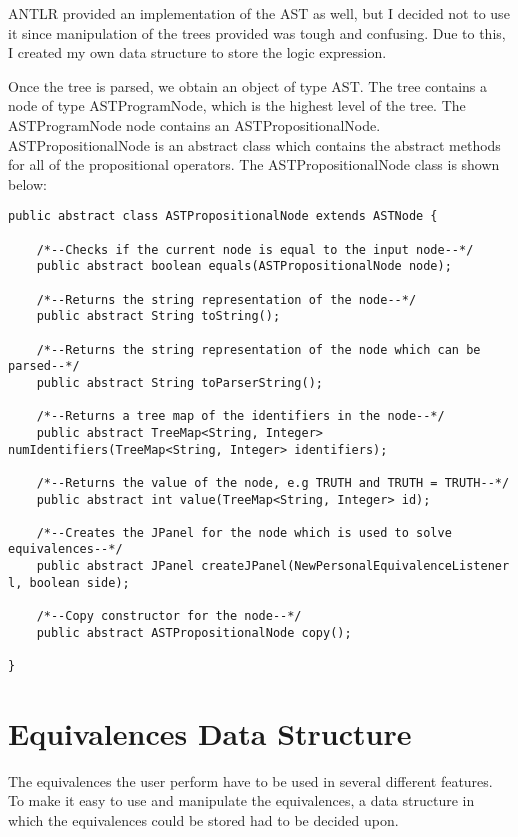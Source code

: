 \documentclass{report}
\begin{document}
ANTLR provided an implementation of the AST as well, but I decided not to use it
since manipulation of the trees provided was tough and confusing. Due to this,
I created my own data structure to store the logic expression.

Once the tree is parsed, we obtain an object of type AST. The tree contains
a node of type ASTProgramNode, which is the highest level of the tree. The ASTProgramNode
node contains an ASTPropositionalNode. ASTPropositionalNode is an abstract class
which contains the abstract methods for all of the propositional operators. The
ASTPropositionalNode class is shown below:

\begin{lstlisting}[caption=Methods held in a Propositional Node, label=find]
public abstract class ASTPropositionalNode extends ASTNode {

	/*--Checks if the current node is equal to the input node--*/
	public abstract boolean equals(ASTPropositionalNode node);

	/*--Returns the string representation of the node--*/
	public abstract String toString();

	/*--Returns the string representation of the node which can be parsed--*/
	public abstract String toParserString();

	/*--Returns a tree map of the identifiers in the node--*/
	public abstract TreeMap<String, Integer> numIdentifiers(TreeMap<String, Integer> identifiers);
	
	/*--Returns the value of the node, e.g TRUTH and TRUTH = TRUTH--*/
	public abstract int value(TreeMap<String, Integer> id);

	/*--Creates the JPanel for the node which is used to solve equivalences--*/
	public abstract JPanel createJPanel(NewPersonalEquivalenceListener l, boolean side);
	
	/*--Copy constructor for the node--*/
	public abstract ASTPropositionalNode copy();

}
\end{lstlisting}

\section{Equivalences Data Structure}

The equivalences the user perform have to be used in several different features.
To make it easy to use and manipulate the equivalences, a data structure in which
the equivalences could be stored had to be decided upon. 
\end{document}
